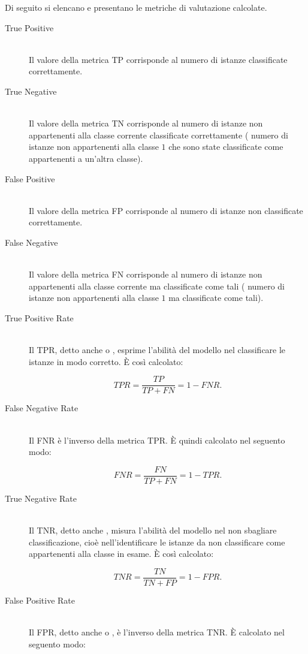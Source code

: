 Di seguito si elencano e presentano le metriche di valutazione calcolate.
\begin{description}
	\item[True Positive] \hfill \\
	Il valore della metrica \acf{TP} corrisponde al numero di istanze classificate correttamente.
	\item[True Negative] \hfill \\
	Il valore della metrica \acf{TN} corrisponde al numero di istanze non appartenenti alla classe corrente classificate correttamente (\eg{} numero di istanze non appartenenti alla classe $1$ che sono state classificate come appartenenti a un'altra classe).
	\item[False Positive] \hfill \\
	Il valore della metrica \acf{FP} corrisponde al numero di istanze non classificate correttamente.
	\item[False Negative] \hfill \\
	Il valore della metrica \acf{FN} corrisponde al numero di istanze non appartenenti alla classe corrente ma classificate come tali (\eg{} numero di istanze non appartenenti alla classe $1$ ma classificate come tali).
	\item[True Positive Rate] \hfill \\
	Il \acf{TPR}, detto anche \emph{} o \emph{}, esprime l'abilità del modello nel classificare le istanze in modo corretto. \`E così calcolato:\par
	\[TPR=\frac{TP}{TP + FN} = 1 - FNR\text{.}\]
	\item[False Negative Rate] \hfill \\
	Il \acf{FNR} è l'inverso della metrica \acs{TPR}. \`E quindi calcolato nel seguento modo:\par
	\[FNR=\frac{FN}{TP + FN} = 1 - TPR\text{.}\]
	\item[True Negative Rate] \hfill \\
	Il \acf{TNR}, detto anche \emph{}, misura l'abilità del modello nel non sbagliare classificazione, cioè nell'identificare le istanze da non classificare come appartenenti alla classe in esame. \`E così calcolato:\par
	\[TNR=\frac{TN}{TN + FP} = 1 - FPR\text{.}\]
	\item[False Positive Rate] \hfill \\
	Il \acf{FPR}, detto anche \emph{} o \emph{}, è l'inverso della metrica \acs{TNR}. \`E calcolato nel seguento modo:\par

\end{description}
